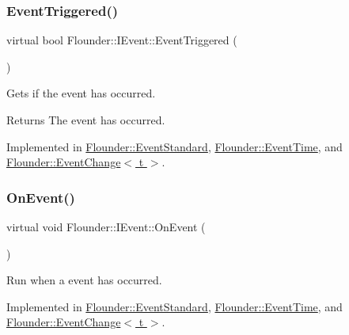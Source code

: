 \subsubsection{\texorpdfstring{Event\+Triggered()}{EventTriggered()}}
{\footnotesize\ttfamily virtual bool Flounder\+::\+I\+Event\+::\+Event\+Triggered (\begin{DoxyParamCaption}{ }\end{DoxyParamCaption})\hspace{0.3cm}{\ttfamily [pure virtual]}}



Gets if the event has occurred. 

\begin{DoxyReturn}{Returns}
The event has occurred. 
\end{DoxyReturn}


Implemented in \hyperlink{class_flounder_1_1_event_standard_a796cd5eb9098a0d2773b32581b9a0899}{Flounder\+::\+Event\+Standard}, \hyperlink{class_flounder_1_1_event_time_a4651610c70a6a869c0f6c223d8f7eb52}{Flounder\+::\+Event\+Time}, and \hyperlink{class_flounder_1_1_event_change_a1c6e0cafceb20ee7e6197e570abf17d8}{Flounder\+::\+Event\+Change$<$ t $>$}.

\mbox{\label{class_flounder_1_1_i_event_a67f7265c6decfdf4d29b94a088f45501}} 
\subsubsection{\texorpdfstring{On\+Event()}{OnEvent()}}
{\footnotesize\ttfamily virtual void Flounder\+::\+I\+Event\+::\+On\+Event (\begin{DoxyParamCaption}{ }\end{DoxyParamCaption})\hspace{0.3cm}{\ttfamily [pure virtual]}}



Run when a event has occurred. 



Implemented in \hyperlink{class_flounder_1_1_event_standard_a3981a5be6ab41ce624b9752d5f7bdf36}{Flounder\+::\+Event\+Standard}, \hyperlink{class_flounder_1_1_event_time_abeafc8779ee5be6e8b4ec701029fb15e}{Flounder\+::\+Event\+Time}, and \hyperlink{class_flounder_1_1_event_change_a07f5769fc3e4c401e1f3929978f759fc}{Flounder\+::\+Event\+Change$<$ t $>$}.

